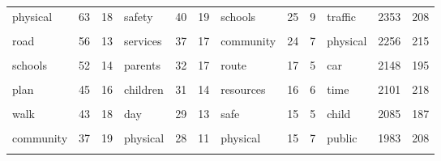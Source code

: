 \documentclass[]{elsarticle} %
\begin{document}
\begin{table}
{\begin{tabular}[t]{lcclcclcclcc}
physical & 63 & 18 & safety & 40 & 19 & schools & 25 & 9 & traffic & 2353 & 208\\
\cellcolor{gray!6}{traffic} & \cellcolor{gray!6}{59} & \cellcolor{gray!6}{20} & \cellcolor{gray!6}{safe} & \cellcolor{gray!6}{39} & \cellcolor{gray!6}{19} & \cellcolor{gray!6}{children} & \cellcolor{gray!6}{25} & \cellcolor{gray!6}{6} & \cellcolor{gray!6}{choice} & \cellcolor{gray!6}{2299} & \cellcolor{gray!6}{169}\\
road & 56 & 13 & services & 37 & 17 & community & 24 & 7 & physical & 2256 & 215\\
\addlinespace
\cellcolor{gray!6}{activity} & \cellcolor{gray!6}{55} & \cellcolor{gray!6}{14} & \cellcolor{gray!6}{planning} & \cellcolor{gray!6}{37} & \cellcolor{gray!6}{7} & \cellcolor{gray!6}{bus} & \cellcolor{gray!6}{18} & \cellcolor{gray!6}{4} & \cellcolor{gray!6}{trips} & \cellcolor{gray!6}{2194} & \cellcolor{gray!6}{170}\\
schools & 52 & 14 & parents & 32 & 17 & route & 17 & 5 & car & 2148 & 195\\
\cellcolor{gray!6}{children} & \cellcolor{gray!6}{47} & \cellcolor{gray!6}{15} & \cellcolor{gray!6}{sustainable} & \cellcolor{gray!6}{31} & \cellcolor{gray!6}{8} & \cellcolor{gray!6}{zone} & \cellcolor{gray!6}{16} & \cellcolor{gray!6}{6} & \cellcolor{gray!6}{safety} & \cellcolor{gray!6}{2140} & \cellcolor{gray!6}{204}\\
plan & 45 & 16 & children & 31 & 14 & resources & 16 & 6 & time & 2101 & 218\\
\cellcolor{gray!6}{students} & \cellcolor{gray!6}{44} & \cellcolor{gray!6}{14} & \cellcolor{gray!6}{child} & \cellcolor{gray!6}{31} & \cellcolor{gray!6}{12} & \cellcolor{gray!6}{day} & \cellcolor{gray!6}{16} & \cellcolor{gray!6}{4} & \cellcolor{gray!6}{factors} & \cellcolor{gray!6}{2101} & \cellcolor{gray!6}{216}\\
\addlinespace
walk & 43 & 18 & day & 29 & 13 & safe & 15 & 5 & child & 2085 & 187\\
\cellcolor{gray!6}{public} & \cellcolor{gray!6}{39} & \cellcolor{gray!6}{15} & \cellcolor{gray!6}{routes} & \cellcolor{gray!6}{28} & \cellcolor{gray!6}{14} & \cellcolor{gray!6}{planning} & \cellcolor{gray!6}{15} & \cellcolor{gray!6}{4} & \cellcolor{gray!6}{walk} & \cellcolor{gray!6}{2008} & \cellcolor{gray!6}{200}\\
community & 37 & 19 & physical & 28 & 11 & physical & 15 & 7 & public & 1983 & 208\\
\cellcolor{gray!6}{safe} & \cellcolor{gray!6}{34} & \cellcolor{gray!6}{16} & \cellcolor{gray!6}{health} & \cellcolor{gray!6}{28} & \cellcolor{gray!6}{11} & \cellcolor{gray!6}{healthy} & \cellcolor{gray!6}{14} & \cellcolor{gray!6}{6} & \cellcolor{gray!6}{age} & \cellcolor{gray!6}{1783} & \cellcolor{gray!6}{211}\\

\end{tabular}}
\end{table}
\end{document}
